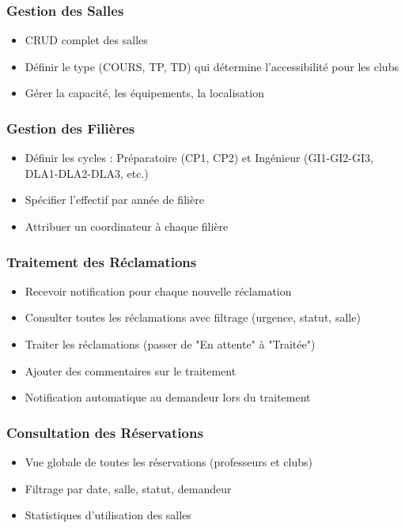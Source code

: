 \documentclass[12pt,a4paper]{article}
\begin{document}
\subsubsection{Gestion des Salles}
\begin{itemize}
    \item CRUD complet des salles
    \item Définir le type (COURS, TP, TD) qui détermine l'accessibilité pour les clubs
    \item Gérer la capacité, les équipements, la localisation
\end{itemize}

\subsubsection{Gestion des Filières}
\begin{itemize}
    \item Définir les cycles : Préparatoire (CP1, CP2) et Ingénieur (GI1-GI2-GI3, DLA1-DLA2-DLA3, etc.)
    \item Spécifier l'effectif par année de filière
    \item Attribuer un coordinateur à chaque filière
\end{itemize}

\subsubsection{Traitement des Réclamations}
\begin{itemize}
    \item Recevoir notification pour chaque nouvelle réclamation
    \item Consulter toutes les réclamations avec filtrage (urgence, statut, salle)
    \item Traiter les réclamations (passer de "En attente" à "Traitée")
    \item Ajouter des commentaires sur le traitement
    \item Notification automatique au demandeur lors du traitement
\end{itemize}

\subsubsection{Consultation des Réservations}
\begin{itemize}
    \item Vue globale de toutes les réservations (professeurs et clubs)
    \item Filtrage par date, salle, statut, demandeur
    \item Statistiques d'utilisation des salles
\end{itemize}
\end{document}
